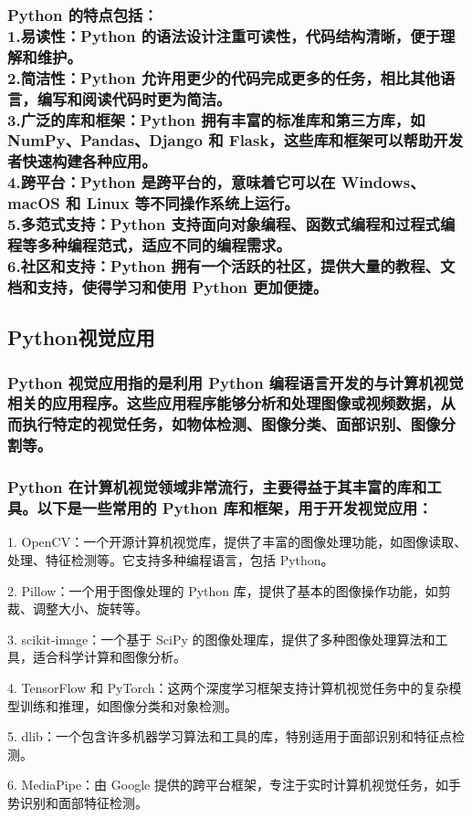 \documentclass[UTF8,a4paper]{ctexart}
\begin{document}
\begin{sloppypar}
	\subsubsection{Python 的特点包括：\\1.易读性：Python 的语法设计注重可读性，代码结构清晰，便于理解和维护。\\2.简洁性：Python 允许用更少的代码完成更多的任务，相比其他语言，编写和阅读代码时更为简洁。\\3.广泛的库和框架：Python 拥有丰富的标准库和第三方库，如 NumPy、Pandas、Django 和 Flask，这些库和框架可以帮助开发者快速构建各种应用。\\4.跨平台：Python 是跨平台的，意味着它可以在 Windows、macOS 和 Linux 等不同操作系统上运行。\\5.多范式支持：Python 支持面向对象编程、函数式编程和过程式编程等多种编程范式，适应不同的编程需求。\\6.社区和支持：Python 拥有一个活跃的社区，提供大量的教程、文档和支持，使得学习和使用 Python 更加便捷。}
	\subsection{Python视觉应用}
	\subsubsection{Python 视觉应用指的是利用 Python 编程语言开发的与计算机视觉相关的应用程序。这些应用程序能够分析和处理图像或视频数据，从而执行特定的视觉任务，如物体检测、图像分类、面部识别、图像分割等。}
	\subsubsection{Python 在计算机视觉领域非常流行，主要得益于其丰富的库和工具。以下是一些常用的 Python 库和框架，用于开发视觉应用：}
	1. OpenCV：一个开源计算机视觉库，提供了丰富的图像处理功能，如图像读取、处理、特征检测等。它支持多种编程语言，包括 Python。
	
	2. Pillow：一个用于图像处理的 Python 库，提供了基本的图像操作功能，如剪裁、调整大小、旋转等。
	
	3. scikit-image：一个基于 SciPy 的图像处理库，提供了多种图像处理算法和工具，适合科学计算和图像分析。
	
	4. TensorFlow 和 PyTorch：这两个深度学习框架支持计算机视觉任务中的复杂模型训练和推理，如图像分类和对象检测。
	
	5. dlib：一个包含许多机器学习算法和工具的库，特别适用于面部识别和特征点检测。
	
	6. MediaPipe：由 Google 提供的跨平台框架，专注于实时计算机视觉任务，如手势识别和面部特征检测。

\end{sloppypar}
\end{document}
